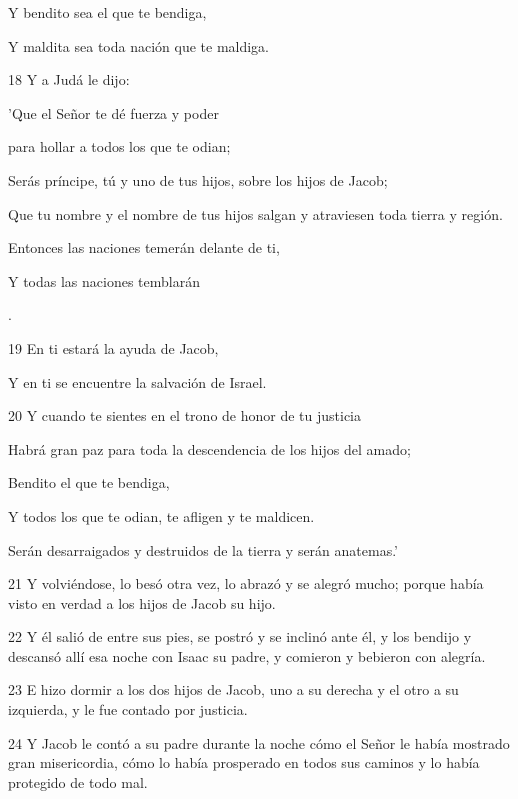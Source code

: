 \par     Y bendito sea el que te bendiga,  
\par     Y maldita sea toda nación que te maldiga.
\par    
\par 18 Y a Judá le dijo:  
\par     'Que el Señor te dé fuerza y ​​poder
\par    
\par     para hollar a todos los que te odian;  
\par     Serás príncipe, tú y uno de tus hijos, sobre los hijos de Jacob;
\par    
\par     Que tu nombre y el nombre de tus hijos salgan y atraviesen toda tierra y región.  
\par     Entonces las naciones temerán delante de ti,
\par    
\par     Y todas las naciones temblarán  
\par     [Y todos los pueblos temblarán].
\par    
\par 19 En ti estará la ayuda de Jacob,  
\par     Y en ti se encuentre la salvación de Israel.
\par    
\par 20 Y cuando te sientes en el trono de honor de tu justicia  
\par     Habrá gran paz para toda la descendencia de los hijos del amado;
\par    
\par     Bendito el que te bendiga,  
\par     Y todos los que te odian, te afligen y te maldicen.  
\par     Serán desarraigados y destruidos de la tierra y serán anatemas.'
\par    
\par 21 Y volviéndose, lo besó otra vez, lo abrazó y se alegró mucho; porque había visto en verdad a los hijos de Jacob su hijo.
\par 22 Y él salió de entre sus pies, se postró y se inclinó ante él, y los bendijo y descansó allí esa noche con Isaac su padre, y comieron y bebieron con alegría.
\par 23 E hizo dormir a los dos hijos de Jacob, uno a su derecha y el otro a su izquierda, y le fue contado por justicia.
\par 24 Y Jacob le contó a su padre durante la noche cómo el Señor le había mostrado gran misericordia, cómo lo había prosperado en todos sus caminos y lo había protegido de todo mal.
